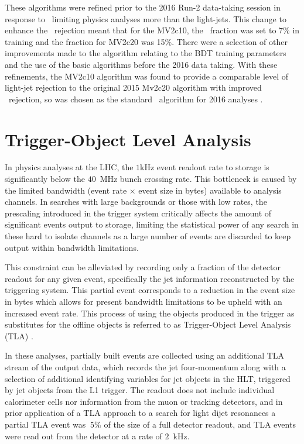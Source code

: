 	These algorithms were refined prior to the 2016 Run-2 data-taking session in response to \cjets\ limiting physics analyses more than the light-jets. This change  to enhance the \cjet\ rejection meant that for the MV2c10, the \cjet\ fraction was set to 7\% in training and the fraction for MV2c20 was 15\%. There were a selection of other improvements made to the algorithm relating to the BDT training parameters and the use of the basic algorithms before the 2016 data taking. With these refinements, the MV2c10 algorithm was found to provide a comparable level of light-jet rejection to the original 2015 Mv2c20 algorithm with improved \cjet\ rejection, so was chosen as the standard \btag\ algorithm for 2016 analyses \cite{btagOptimisation}.


\section{Trigger-Object Level Analysis}
\label{t:tla}

	In physics analyses at the LHC, the $1$kHz event readout rate to storage is significantly below the $40$~MHz bunch crossing rate. This bottleneck is caused by the limited bandwidth (event rate $\times$ event size in bytes) available to analysis channels. In searches with large backgrounds or those with low rates, the prescaling introduced in the trigger system critically affects the amount of significant events output to storage, limiting the statistical power of any search in these hard to isolate channels as a large number of events are discarded to keep output within bandwidth limitations.

	This constraint can be alleviated by recording only a fraction of the detector readout for any given event, specifically the jet information reconstructed by the triggering system. This partial event corresponds to a reduction in the event size in bytes which allows for present bandwidth limitations to be upheld with an increased event rate. This process of using the objects produced in the trigger as substitutes for the offline objects is referred to as Trigger-Object Level Analysis (TLA) \cite{tla}.

	\newpage
	In these analyses, partially built events are collected using an additional TLA stream of the output data, which records the jet four-momentum along with a selection of additional identifying variables for jet objects in the HLT, triggered by jet objects from the L1 trigger. The readout does not include individual calorimeter cells nor information from the muon or tracking detectors, and in prior application of a TLA approach to a search for light dijet resonances \cite{tla} a partial TLA event was $~5\%$ of the size of a full detector readout, and TLA events were read out from the detector at a rate of $2$~kHz.

\endinput
